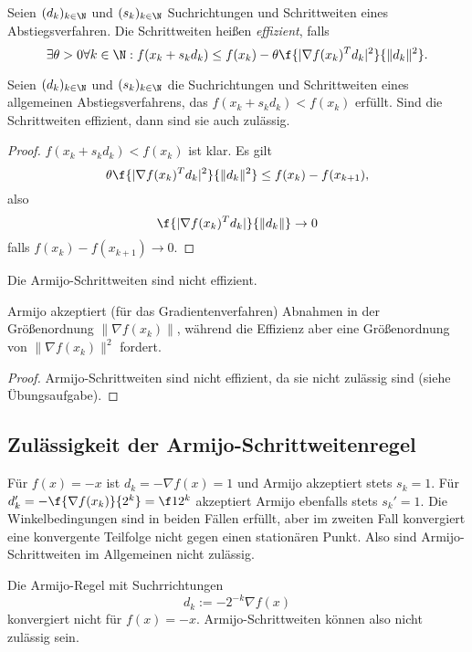 \begin{df} \label{2.33}
	Seien $(d_k)_{k\in \N}$ und $(s_k)_{k\in\N}$ Suchrichtungen und Schrittweiten eines Abstiegsverfahren.
	Die Schrittweiten heißen \emph{effizient}, falls
	\[
		\exists \theta > 0 \forall k \in \N
		: f(x_k + s_k d_k) \le f(x_k) - \theta \f {|\nabla f(x_k)^T d_k|^2}{\|d_k\|^2}.
	\]
\end{df}

\begin{st} \label{2.34}
	Seien $(d_k)_{k\in\N}$ und $(s_k)_{k\in\N}$ die Suchrichtungen und Schrittweiten eines allgemeinen Abstiegsverfahrens, das $f(x_k + s_k d_k) < f(x_k)$ erfüllt.
	Sind die Schrittweiten effizient, dann sind sie auch zulässig.
	\begin{proof}
		$f(x_k+s_kd_k) < f(x_k)$ ist klar.
		Es gilt
		\[
			\theta \f {|\nabla f(x_k)^T d_k|^2}{\|d_k\|^2}
			\le f(x_k) - f(x_{k+1}),
		\]
		also
		\[
			\f{|\nabla f(x_k)^T d_k|}{\|d_k\|} \to 0
		\]
		falls $f(x_k) - f(x_{k+1}) \to 0$.
	\end{proof}
\end{st}

\begin{nt*}
	Die Armijo-Schrittweiten sind nicht effizient.

	Armijo akzeptiert (für das Gradientenverfahren) Abnahmen in der Größenordnung $\|\nabla f(x_k)\|$, während die Effizienz aber eine Größenordnung von $\|\nabla f(x_k)\|^2$ fordert.

	\begin{proof}
		Armijo-Schrittweiten sind nicht effizient, da sie nicht zulässig sind (siehe Übungsaufgabe).
	\end{proof}
\end{nt*}

\subsection{Zulässigkeit der Armijo-Schrittweitenregel}

Für $f(x) = -x$ ist $d_k = - \nabla f(x) = 1$ und Armijo akzeptiert stets $s_k = 1$.
Für $d_k' = - \f{\nabla f(x_k)}{2^k} = \f 1{2^k}$ akzeptiert Armijo ebenfalls stets $s_k' = 1$.
Die Winkelbedingungen sind in beiden Fällen erfüllt, aber im zweiten Fall konvergiert eine konvergente Teilfolge nicht gegen einen stationären Punkt.
Also sind Armijo-Schrittweiten im Allgemeinen nicht zulässig.

\begin{ex} \label{2.35}
	Die Armijo-Regel mit Suchrrichtungen
	\[
		d_k := -2^{-k} \nabla f(x)
	\]
	konvergiert nicht für $f(x) = -x$.
	Armijo-Schrittweiten können also nicht zulässig sein.
\end{ex}

